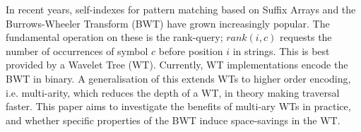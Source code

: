 In recent years, self-indexes for pattern matching based on Suffix
Arrays and the Burrows-Wheeler Transform (BWT) have grown
increasingly popular. The fundamental operation on these is the
rank-query; $rank(i, c)$ requests the number of occurrences of
symbol $c$ before position $i$ in strings. This is best provided by
a Wavelet Tree (WT). Currently, WT implementations encode the BWT
in binary. A generalisation of this extends WTs to higher order
encoding, i.e. multi-arity, which reduces the depth of a WT, in
theory making traversal faster. This paper aims to investigate the
benefits of multi-ary WTs in practice, and whether specific
properties of the BWT induce space-savings in the WT.
